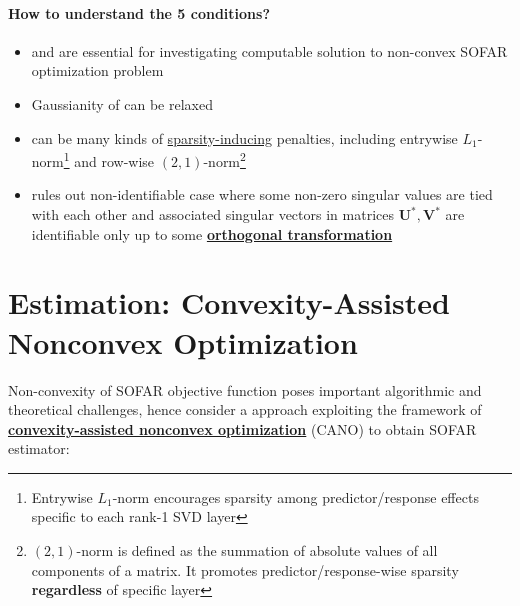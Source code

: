 \documentclass[twoside]{article}
\begin{document}
\paragraph{How to understand the 5 conditions?}
\begin{itemize}
    \item {} and  are essential for investigating computable solution to non-convex SOFAR optimization problem 
    \item Gaussianity of  can be relaxed 
    \item {} can be many kinds of \underline{sparsity-inducing} penalties, including entrywise $L_1$-norm\footnote{Entrywise $L_1$-norm encourages sparsity among predictor/response effects specific to each rank-1 SVD layer} and row-wise $(2,1)$-norm\footnote{$(2,1)$-norm is defined as the summation of absolute values of all components of a matrix. It promotes predictor/response-wise sparsity \textbf{regardless} of specific layer}
    \item {} rules out non-identifiable case where some non-zero singular values are tied with each other and associated singular vectors in matrices $\mathbf{U}^*,\mathbf{V}^*$ are identifiable only up to some \textbf{\underline{orthogonal transformation}}
\end{itemize}

\section{Estimation: Convexity-Assisted Nonconvex Optimization}
Non-convexity of SOFAR objective function poses important algorithmic and theoretical challenges, hence consider a  approach exploiting the framework of \underline{\textbf{convexity-assisted nonconvex optimization}} (CANO) to obtain SOFAR estimator:
\end{document}
